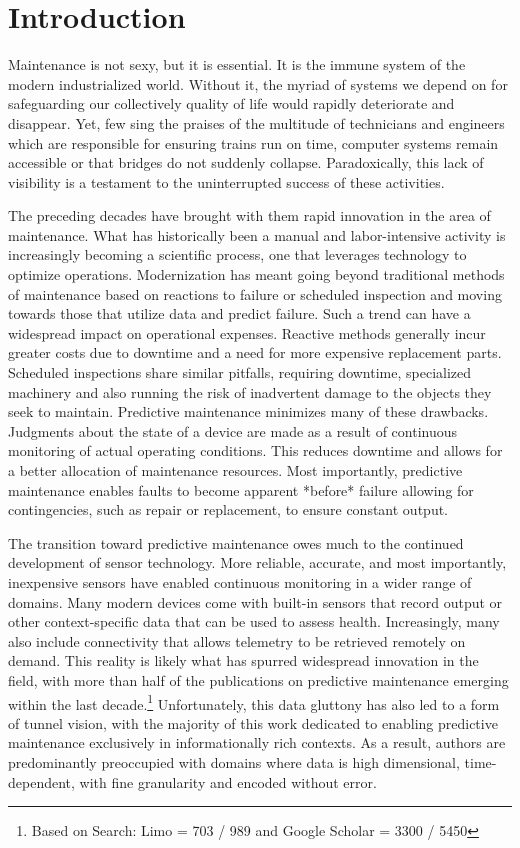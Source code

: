 \chapter*{Introduction}

Maintenance is not sexy, but it is essential. It is the immune system of the modern industrialized world. Without it, the myriad of systems we depend on for safeguarding our collectively quality of life would rapidly deteriorate and disappear. Yet, few sing the praises of the multitude of technicians and engineers which are responsible for ensuring trains run on time, computer systems remain accessible or that bridges do not suddenly collapse. Paradoxically, this lack of visibility is a testament to the uninterrupted success of these activities. 

The preceding decades have brought with them rapid innovation in the area of maintenance. What has historically been a manual and labor-intensive activity is increasingly becoming a scientific process, one that leverages technology to optimize operations. Modernization has meant going beyond traditional methods of maintenance based on reactions to failure or scheduled inspection and moving towards those that utilize data and predict failure. Such a trend can have a widespread impact on operational expenses. Reactive methods generally incur greater costs due to downtime and a need for more expensive replacement parts. Scheduled inspections share similar pitfalls, requiring downtime, specialized machinery and also running the risk of inadvertent damage to the objects they seek to maintain. Predictive maintenance minimizes many of these drawbacks. Judgments about the state of a device are made as a result of continuous monitoring of actual operating conditions\cite{Mobley2002}. This reduces downtime and allows for a better allocation of maintenance resources. Most importantly, predictive maintenance enables faults to become apparent *before* failure allowing for contingencies, such as repair or replacement, to ensure constant output.


The transition toward predictive maintenance owes much to the continued development of sensor technology. More reliable, accurate, and most importantly, inexpensive sensors have enabled continuous monitoring in a wider range of domains. Many modern devices come with built-in sensors that record output or other context-specific data that can be used to assess health. Increasingly, many also include connectivity that allows telemetry to be retrieved remotely on demand. This reality is likely what has spurred widespread innovation in the field, with more than half of the publications on predictive maintenance emerging within the last decade.\footnote{Based on Search: Limo = 703 / 989 and Google Scholar = 3300 / 5450} Unfortunately, this data gluttony has also led to a form of tunnel vision, with the majority of this work dedicated to enabling predictive maintenance exclusively in informationally rich contexts. As a result, authors are predominantly preoccupied with domains where data is high dimensional, time-dependent, with fine granularity and encoded without error. 


